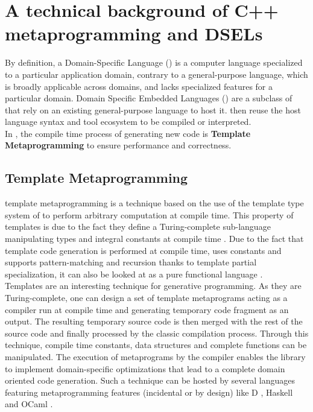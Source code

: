 \documentclass[../../main]{subfiles}
\begin{document}
\section{
  A technical background of C++ metaprogramming and DSELs
}

By definition, a Domain-Specific Language (\dsl) is a computer language
specialized to a particular application domain, contrary to a general-purpose
language, which is broadly applicable across domains, and lacks specialized
features for a particular domain. Domain Specific Embedded Languages (\dsels)
are a subclass of \dsl that rely on an existing general-purpose language to host
it. \dsels then reuse the host language syntax and tool ecosystem to be compiled
or interpreted.
\\

In \cpp, the compile time process of generating new code is
\textbf{Template Metaprogramming} to ensure performance and correctness.

\subsection{
  Template Metaprogramming
}

\cpp template metaprogramming \cite{abrahams:2004} is a technique based on the
use of the template type system of \cpp to perform arbitrary computation at
compile time. This property of \cpp templates is due to the fact they
define a Turing-complete sub-language manipulating types and integral constants
at compile time \cite{unruh:1994}. Due to the fact that template code generation
is performed at compile time, uses constants and supports pattern-matching and
recursion thanks to template partial specialization, it can also be looked
at as a pure functional language \cite{haeri:2012}.
\\

Templates are an interesting technique for generative programming. As they
are Turing-complete, one can design a set of template metaprograms acting as a
\dsl compiler run at compile time and generating temporary \cpp code fragment as
an output. The resulting temporary source code is then merged with the rest of
the source code and finally processed by the classic compilation process.
Through this technique, compile time constants, data structures and complete
functions can be manipulated. The execution of metaprograms by the compiler
enables the library to implement domain-specific optimizations that lead to a
complete domain oriented code generation. Such a technique can be hosted by
several languages featuring metaprogramming features (incidental or by design)
like D \cite{template:dlang}, Haskell \cite{sheard:2002} and
OCaml \cite{serot:2008}.
\end{document}

